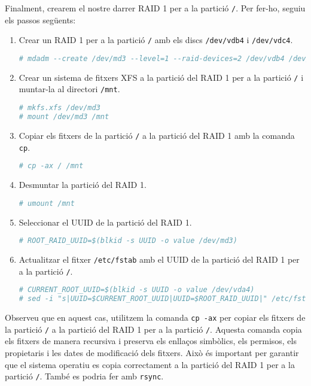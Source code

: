 Finalment, crearem el nostre darrer RAID 1 per a la partició \texttt{/}. Per fer-ho, seguiu els passos següents:

\begin{enumerate}
        \item Crear un RAID 1 per a la partició \texttt{/} amb els discs \texttt{/dev/vdb4} i \texttt{/dev/vdc4}.
\begin{lstlisting}[language=bash, numbers=none, commentstyle=\color{black}]
# mdadm --create /dev/md3 --level=1 --raid-devices=2 /dev/vdb4 /dev/vdc4
\end{lstlisting}
        \item Crear un sistema de fitxers XFS a la partició del RAID 1 per a la partició \texttt{/} i muntar-la al directori \texttt{/mnt}.
\begin{lstlisting}[language=bash, numbers=none, commentstyle=\color{black}]
# mkfs.xfs /dev/md3
# mount /dev/md3 /mnt
\end{lstlisting}
        \item Copiar els fitxers de la partició \texttt{/} a la partició del RAID 1 amb la comanda \texttt{cp}.
\begin{lstlisting}[language=bash, numbers=none, commentstyle=\color{black}]
# cp -ax / /mnt
\end{lstlisting}
        \item Desmuntar la partició del RAID 1.
\begin{lstlisting}[language=bash, numbers=none, commentstyle=\color{black}]
# umount /mnt
\end{lstlisting}
        \item Seleccionar el UUID de la partició del RAID 1.
\begin{lstlisting}[language=bash, numbers=none, commentstyle=\color{black}]
# ROOT_RAID_UUID=$(blkid -s UUID -o value /dev/md3)
\end{lstlisting}
        \item Actualitzar el fitxer \texttt{/etc/fstab} amb el UUID de la partició del RAID 1 per a la partició \texttt{/}.
\begin{lstlisting}[language=bash, numbers=none, commentstyle=\color{black}]
# CURRENT_ROOT_UUID=$(blkid -s UUID -o value /dev/vda4)
# sed -i "s|UUID=$CURRENT_ROOT_UUID|UUID=$ROOT_RAID_UUID|" /etc/fstab
\end{lstlisting}
\end{enumerate}

\begin{info}
Observeu que en aquest cas, utilitzem la comanda \texttt{cp -ax} per copiar els fitxers de la partició \texttt{/} a la partició del RAID 1 per a la partició \texttt{/}. Aquesta comanda copia els fitxers de manera recursiva i preserva els enllaços simbòlics, els permisos, els propietaris i les dates de modificació dels fitxers. Això és important per garantir que el sistema operatiu es copia correctament a la partició del RAID 1 per a la partició \texttt{/}. També es podria fer amb \texttt{rsync}.
\end{info}

